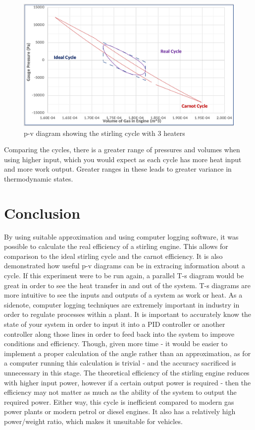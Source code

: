 \documentclass[12pt]{article}
\begin{document}
        \begin{figure}[H]
            \captionsetup{labelfont=bf}
            \includegraphics[width=40pc]{cycle3.png}
            \caption{p-v diagram showing the stirling cycle with 3 heaters}\label{cycle3}
        \end{figure}
        Comparing the cycles, there is a greater range of pressures and volumes when using higher input, which you would expect as each cycle has more heat input and more work output.
        Greater ranges in these leads to greater variance in thermodynamic states. 
    \section{Conclusion}
        By using suitable approximation and using computer logging software, it was possible to calculate the real efficiency of a stirling engine. This allows for comparison
        to the ideal stirling cycle and the carnot efficiency. It is also demonstrated how useful p-v diagrams can be in extracing information about a cycle. If this experiment
        were to be run again, a parallel T-s diagram would be great in order to see the heat transfer in and out of the system. T-s diagrams are more intuitive to see the inputs
        and outputs of a system as work or heat. As a sidenote, computer logging techniques are extremely important in industry in order to regulate processes within a plant.
        It is important to accurately know the state of your system in order to input it into a PID controller or another controller along those lines in order to feed back
        into the system to improve conditions and efficiency. Though, given more time - it would be easier to implement a proper calculation of the angle rather than an approximation,
        as for a computer running this calculation is trivial - and the accuracy sacrificed is unnecessary in this stage. The theoretical efficiency of the stirling engine reduces
        with higher input power, however if a certain output power is required - then the efficiency may not matter as much as the ability of the system to output the required power.
         Either way, this cycle is inefficient compared to modern gas power plants or modern petrol or diesel engines. It also has a relatively high power/weight ratio, which makes
         it unsuitable for vehicles. 
    
\end{document}
